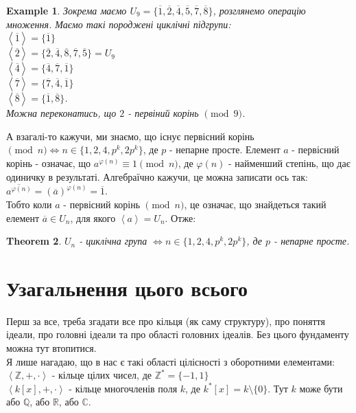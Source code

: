 \documentclass[a4paper, 10pt]{article}
\theoremstyle{theoremdd}
\newtheorem{theorem}{Theorem}[subsection]
\theoremstyle{theoremdd}
\theoremstyle{theoremdd}
\theoremstyle{theoremdd}
\newtheorem{example}[theorem]{Example}
\theoremstyle{theoremdd}
\theoremstyle{theoremdd}
\theoremstyle{theoremdd}
\theoremstyle{theoremdd}
\begin{document}
\begin{example}
Зокрема маємо $U_9 = \{ \overline{1}, \overline{2}, \overline{4}, \overline{5}, \overline{7}, \overline{8} \}$, розглянемо операцію множення. Маємо такі породжені циклічні підгрупи:\\
$\left< \overline{1} \right> = \{ \overline{1} \}$\\
$\left< \overline{2} \right> = \{ \overline{2}, \overline{4}, \overline{8}, \overline{7}, \overline{5} \} = U_9$\\
$\left< \overline{4} \right> = \{ \overline{4}, \overline{7}, \overline{1} \}$\\
$\left< \overline{7} \right> = \{ \overline{7},\overline{4},\overline{1} \}$\\
$\left< \overline{8} \right> = \{ \overline{1}, \overline{8} \}$.\\
Можна переконатись, що $2$ - первіний корінь $\pmod 9$.
\end{example}

А взагалі-то кажучи, ми знаємо, що існує первісний корінь $\pmod n \iff n \in \{1,2,4,p^k,2p^k\}$, де $p$ - непарне просте. Елемент $a$ - первісний корінь -  означає, що $a^{\varphi(n)} \equiv 1 \pmod n$, де $\varphi(n)$ - найменший степінь, що дає одиничку в результаті. Алгебраїчно кажучи, це можна записати ось так:\\
$\overline{a^{\varphi(n)}} = (\overline{a})^{\varphi(n)} = \overline{1}$.\\
Тобто коли $a$ - первісний корінь $\pmod n$, це означає, що знайдеться такий елемент $\overline{a} \in U_n$, для якого $\left< a \right> = U_n$. Отже:

\begin{theorem}
$U_n$ - циклічна група $\iff n \in \{1,2,4,p^k,2p^k\}$, де $p$ - непарне просте.
\end{theorem}
\fi

\newpage
\section{Узагальнення цього всього}
Перш за все, треба згадати все про кільця (як саму структуру), про поняття ідеали, про головні ідеали та про області головних ідеалів. Без цього фундаменту можна тут втопитися.
\bigskip \\
Я лише нагадаю, що в нас є такі області цілісності з оборотними елементами:\\
$\left< \mathbb{Z}, +, \cdot \right>$ - кільце цілих чисел, де $\mathbb{Z}^* = \{-1,1\}$\\
$\left< k[x], +, \cdot \right>$ - кільце многочленів поля $k$, де $k^*[x] = k \setminus \{0\}$. Тут $k$ може бути або $\mathbb{Q}$, або $\mathbb{R}$, або $\mathbb{C}$.
\end{document}
